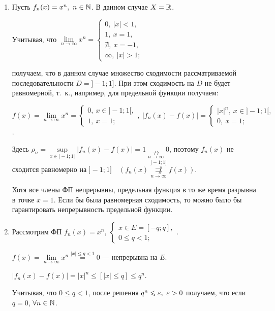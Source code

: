\documentclass[../../main.tex]{subfiles}
\begin{document}
\begin{exmps}
	\;
	
\begin{enumerate}
\item Пусть $f_n(x) = x^n,\ n \in \mathbb{N}$. 
В данном случае $X = \mathbb{R}$. 

Учитывая, что $\underset{n \to \infty}{\lim} x^n = 
\begin{cases}
	0,\ |x| < 1, \\
	1,\  x = 1, \\
	\nexists,\ x = -1, \\
	\infty,\ |x| > 1;
\end{cases}$

получаем, что в данном случае множество сходимости рассматриваемой 
последовательности $D = ]-1;1]$. 
При этом сходимость на $D$ не будет равномерной, т.~к.,
например, для предельной функции получаем:

$f(x) = \underset{n \to \infty}{\lim} x^n = 
\begin{cases}
0,\ x \in ]-1;1[, \\
1,\ x = 1;
\end{cases},\
|f_n(x) - f(x)| = 
\begin{cases}
|x|^n,\ x \in ]-1;1[, \\
0,\ x = 1;
\end{cases}
$.

Здесь $\rho_n = \underset{x \in ]-1;1]}{\sup}|f_n(x)-f(x)| = 1 
\underset{n \to \infty}{\nrightarrow} 0$, поэтому
$f_n(x)$ не сходится равномерно на $]-1;1] \quad
(f_n(x) \overset{]-1;1]}{\underset{n \to \infty}
{\not \rightrightarrows}} f(x))$. 

Хотя все члены ФП непрерывны, предельная функция в то же время
разрывна в точке $x=1$. Если бы была равномерная сходимость, 
то можно было бы гарантировать непрерывность предельной функции.

\item Рассмотрим ФП $f_n(x) = x^n, \
\begin{cases}
	x \in E = [-q;q], \\
	0 \leq q < 1;
\end{cases}.
$

$f(x) = \underset{n \to \infty}{\lim} x^n \overset{|x| \leq q < 1}{=} 0$ ---
непрерывна на $E$.

$|f_n(x) - f(x)| = |x|^n \leq \left[|x| \leq q\right] \leq q^n$.

Учитывая, что $0 \leq q < 1$, после решения 
$q^n \leqslant \varepsilon,\ \varepsilon > 0$ получаем,
что если $q = 0$, $\forall n \in \mathbb{N}$. 


\end{enumerate}
\end{exmps}
\end{document}

